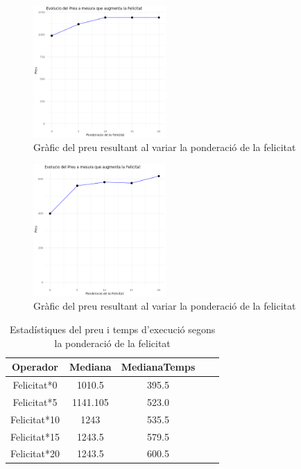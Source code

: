 \documentclass[a4paper]{article}
\begin{document}
	\begin{figure}[H]
		\centering
		\includegraphics[width=0.45\textwidth]{images/exp6_grafic.png}
		\caption{Gràfic del preu resultant al variar la ponderació de la felicitat}
		\label{fig:exp4_grafic}
	\end{figure}
	
	\begin{figure}[H]
		\centering
		\includegraphics[width=0.45\textwidth]{images/exp6b_grafic.png}
		\caption{Gràfic del preu resultant al variar la ponderació de la felicitat}
		\label{fig:exp4b_grafic}
	\end{figure}
	
	\begin{table}[H]
		\centering
		\begin{tabular}{|c|c|c|c|c|}
			\hline
			\textbf{Operador} & \textbf{Mediana} & \textbf{MedianaTemps} \\
			\hline
			Felicitat*0 & 1010.5 & 395.5\\
			\hline
			Felicitat*5 & 1141.105 & 523.0\\
			\hline
			Felicitat*10 & 1243 & 535.5\\
			\hline
			Felicitat*15 & 1243.5 & 579.5\\
			\hline
			Felicitat*20 & 1243.5 & 600.5\\
			\hline
		\end{tabular}
		\caption{Estadístiques del preu i temps d'execució segons la ponderació de la felicitat}
		\label{tab:exp4_estadisticas}
	\end{table}
	
\end{document}

